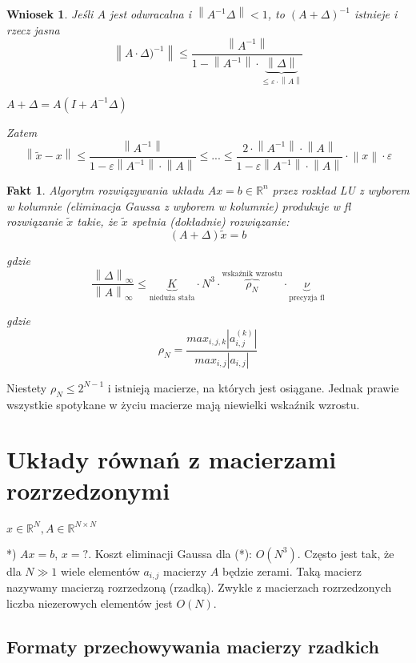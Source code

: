 \documentclass[hidelinks,a4paper,fleqn,oneside]{book}
\newcommand{\RR}{\mathbb{R}}
\newcommand{\norm}[1]{\left\lVert#1\right\rVert}
\newtheorem{wniosek}{Wniosek}
\newtheorem{fakt}{Fakt}
\begin{document}
\begin{wniosek} Jeśli $A$ jest odwracalna i $\norm{A ^ {-1} \Delta} < 1$, to $(A + \Delta)^{-1}$ istnieje i rzecz jasna
	\[
		\norm{A \cdot \Delta)^{-1}} \leq \frac{\norm{A^{-1}}}{1 - \norm{A^{-1}} \cdot \underbrace{\norm{\Delta}}_{\leq \varepsilon \cdot \norm{A}}}
	\]
	
	$A + \Delta = A(I + A^{-1} \Delta)$
	
	Zatem
	\[
		\norm{\tilde{x} - x} \leq \frac{\norm{A^{-1}}}{1 - \varepsilon \norm{A^{-1}} \cdot \norm{A}} \leq ... \leq \frac{2 \cdot \norm{A^{-1}} \cdot \norm{A}}{1 - \varepsilon \norm{A^{-1}} \cdot \norm{A}} \cdot \norm{x} \cdot \varepsilon
	\]
\end{wniosek}

\begin{fakt} Algorytm rozwiązywania układu $Ax = b \in \RR^n$ przez rozkład LU z wyborem w kolumnie (eliminacja Gaussa z wyborem w kolumnie) produkuje w fl rozwiązanie $\tilde{x}$ takie, że $\tilde{x}$ spełnia (dokładnie) rozwiązanie:
	\[
		(A + \Delta)\tilde{x} = b
	\]
	
	gdzie
	\[
		\frac{\norm{\Delta}_\infty}{\norm{A}_\infty} \leq \underbrace{K}_{\textrm{nieduża stała}} \cdot N^3 \cdot \overbrace{\rho_N}^{\textrm{wskaźnik wzrostu}} \cdot \underbrace{\nu}_{\textrm{precyzja fl}}
	\]
	
	gdzie
	\[
		\rho_N = \frac{max_{i, j, k} |a_{i, j}^{(k)}|}{max_{i, j}|a_{i,j}|}
	\]
\end{fakt}

Niestety $\rho_N \leq 2^{N-1}$ i istnieją macierze, na których jest osiągane. Jednak prawie wszystkie spotykane w życiu macierze mają niewielki wskaźnik wzrostu.

\section{Układy równań z macierzami rozrzedzonymi}

$x \in \RR^N, A \in \RR^{N \times N}$

*) $Ax = b$, $x = ?$. Koszt eliminacji Gaussa dla (*): $O(N^3)$. Często jest tak, że dla $N \gg 1$ wiele elementów $a_{i,j}$ macierzy $A$ będzie zerami. Taką macierz nazywamy macierzą rozrzedzoną (rzadką). Zwykle z macierzach rozrzedzonych liczba niezerowych elementów jest $O(N)$.

\subsection{Formaty przechowywania macierzy rzadkich}
\end{document}
